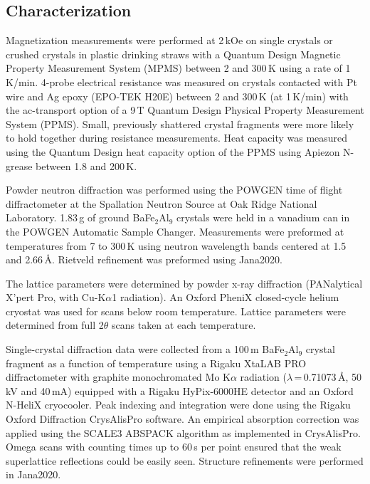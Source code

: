 \documentclass[journal=cmatex,manuscript=article]{achemso}
\begin{document}
\subsection{Characterization}
\label{sec:Exp_characterization}

Magnetization measurements were performed at 2\,kOe on single crystals or crushed crystals in plastic drinking straws with a Quantum Design Magnetic Property Measurement System (MPMS) between 2 and 300\,K using a rate of 1\,K/min. 4-probe electrical resistance was measured on crystals contacted with Pt wire and Ag epoxy (EPO-TEK H20E) between 2 and 300\,K (at 1\,K/min) with the ac-transport option of a 9\,T Quantum Design Physical Property Measurement System (PPMS). Small, previously shattered crystal fragments were more likely to hold together during resistance measurements. Heat capacity was measured using the Quantum Design heat capacity option of the PPMS using Apiezon N-grease between 1.8 and 200\,K.

Powder neutron diffraction was performed using the POWGEN time of flight diffractometer at the Spallation Neutron Source at Oak Ridge National Laboratory\cite{Huq2019_POWGEN}. 1.83\,g of ground BaFe$_2$Al$_9$ crystals were held in a vanadium can in the POWGEN Automatic Sample Changer. Measurements were preformed at temperatures from 7 to 300\,K using neutron wavelength bands centered at 1.5 and 2.66\,\AA. Rietveld refinement was preformed using Jana2020.\cite{Petricek2014_Jana2006}

The lattice parameters were determined by powder x-ray diffraction (PANalytical X'pert Pro, with Cu-K$\alpha$1 radiation). An Oxford PheniX closed-cycle helium cryostat was used for scans below room temperature. Lattice parameters were determined from full 2$\theta$ scans taken at each temperature.

Single-crystal diffraction data were collected from a 100\,\textmu m BaFe$_2$Al$_9$ crystal fragment as a function of temperature using a Rigaku XtaLAB PRO diffractometer with graphite monochromated Mo K$\alpha$ radiation ($\lambda$\,=\,0.71073\,\AA, 50\,kV and 40\,mA) equipped with a Rigaku HyPix-6000HE detector and an Oxford N-HeliX cryocooler. Peak indexing and integration were done using the Rigaku Oxford Diffraction CrysAlisPro software\cite{CrysAlisPRO}. An empirical absorption correction was applied using the SCALE3 ABSPACK algorithm as implemented in CrysAlisPro. Omega scans with counting times up to 60\,s per point ensured that the weak superlattice reflections could be easily seen. Structure refinements were performed in Jana2020.\cite{Petricek2014_Jana2006}
\end{document}
